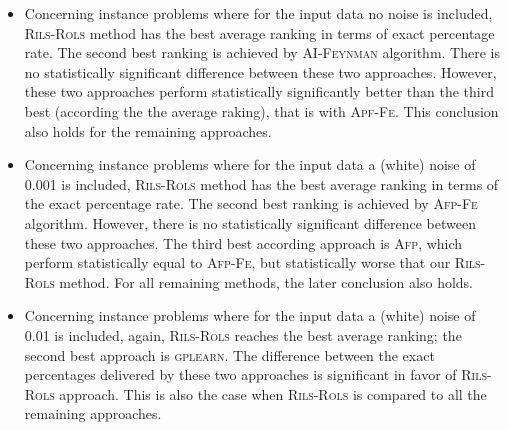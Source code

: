 \documentclass[a4paper,12pt]{elsarticle}
\begin{document}
\begin{itemize}
	\item  Concerning instance problems where for the input data no noise is included, \textsc{Rils}-\textsc{Rols} method has the best average ranking in terms of   exact percentage rate.  The second best ranking is achieved by \textsc{AI-Feynman} algorithm. There is no statistically significant difference between these two approaches. However, these two approaches perform statistically significantly better than the third best (according the the average raking), that is with \textsc{Apf-Fe}. This conclusion also holds for the remaining approaches. 
	\item    Concerning instance problems where for the input data a (white) noise of 0.001 is included, \textsc{Rils}-\textsc{Rols} method has the best average ranking in terms of the exact percentage rate.   The second best ranking is achieved by \textsc{Afp-Fe} algorithm. However,  there is no statistically significant difference between these two approaches. The third best according approach is \textsc{Afp}, which perform statistically equal to \textsc{Afp-Fe}, but statistically worse that our \textsc{Rils}-\textsc{Rols} method. For all remaining methods, the later conclusion also holds.
	\item   Concerning instance problems where for the input data a (white) noise of 0.01 is included, again, \textsc{Rils-Rols} reaches the best average ranking; the second best approach is \textsc{gplearn}. The difference between the exact percentages delivered by these two approaches is significant in favor of \textsc{Rils-Rols} approach. This is also the case when \textsc{Rils-Rols} is compared to all the remaining approaches. 
	
\end{itemize}
\end{document}
